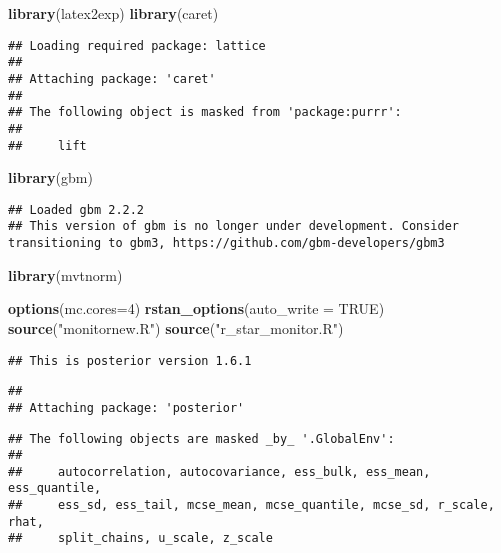 \documentclass[
]{article}
\newenvironment{Shaded}{\begin{snugshade}}{\end{snugshade}}
\newcommand{\AttributeTok}[1]{\textcolor[rgb]{0.13,0.29,0.53}{#1}}
\newcommand{\ConstantTok}[1]{\textcolor[rgb]{0.56,0.35,0.01}{#1}}
\newcommand{\DecValTok}[1]{\textcolor[rgb]{0.00,0.00,0.81}{#1}}
\newcommand{\FunctionTok}[1]{\textcolor[rgb]{0.13,0.29,0.53}{\textbf{#1}}}
\newcommand{\NormalTok}[1]{#1}
\newcommand{\StringTok}[1]{\textcolor[rgb]{0.31,0.60,0.02}{#1}}
\begin{document}
\begin{Shaded}
\begin{Highlighting}[]
\FunctionTok{library}\NormalTok{(latex2exp)}
\FunctionTok{library}\NormalTok{(caret)}
\end{Highlighting}
\end{Shaded}

\begin{verbatim}
## Loading required package: lattice
## 
## Attaching package: 'caret'
## 
## The following object is masked from 'package:purrr':
## 
##     lift
\end{verbatim}

\begin{Shaded}
\begin{Highlighting}[]
\FunctionTok{library}\NormalTok{(gbm)}
\end{Highlighting}
\end{Shaded}

\begin{verbatim}
## Loaded gbm 2.2.2
## This version of gbm is no longer under development. Consider transitioning to gbm3, https://github.com/gbm-developers/gbm3
\end{verbatim}

\begin{Shaded}
\begin{Highlighting}[]
\FunctionTok{library}\NormalTok{(mvtnorm)}
\end{Highlighting}
\end{Shaded}

\begin{Shaded}
\begin{Highlighting}[]
\FunctionTok{options}\NormalTok{(}\AttributeTok{mc.cores=}\DecValTok{4}\NormalTok{)}
\FunctionTok{rstan\_options}\NormalTok{(}\AttributeTok{auto\_write =} \ConstantTok{TRUE}\NormalTok{)}
\FunctionTok{source}\NormalTok{(}\StringTok{"monitornew.R"}\NormalTok{)}
\FunctionTok{source}\NormalTok{(}\StringTok{"r\_star\_monitor.R"}\NormalTok{)}
\end{Highlighting}
\end{Shaded}

\begin{verbatim}
## This is posterior version 1.6.1
\end{verbatim}

\begin{verbatim}
## 
## Attaching package: 'posterior'
\end{verbatim}

\begin{verbatim}
## The following objects are masked _by_ '.GlobalEnv':
## 
##     autocorrelation, autocovariance, ess_bulk, ess_mean, ess_quantile,
##     ess_sd, ess_tail, mcse_mean, mcse_quantile, mcse_sd, r_scale, rhat,
##     split_chains, u_scale, z_scale
\end{verbatim}
\end{document}
